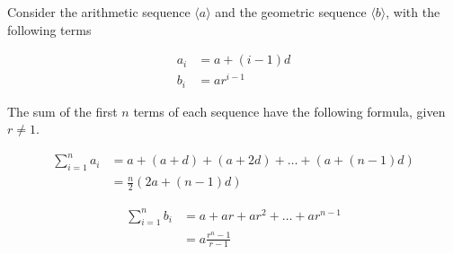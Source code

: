 \documentclass[twoside]{report}
\begin{document}
\vspace{\baselineskip}
\begin{theorem}
	Consider the arithmetic sequence $\langle a \rangle$ and the geometric sequence $\langle b \rangle$, with the following terms
	
	\begin{align*}
		a_i &= a + (i - 1)d \\
		b_i &= a r^{i - 1}
	\end{align*}
	
	The sum of the first $n$ terms of each sequence have the following formula, given $r \neq 1$.
	
	\begin{align}
		\sum_{i = 1}^n a_i &=  a + (a + d) + (a + 2d) + \dots + (a + (n - 1)d) \\
		&= \frac{n}{2} \left( 2a + (n - 1)d \right)
	\end{align}
	
	\begin{align}
		\sum_{i = 1}^n b_i &=  a + ar + ar^2 + \dots + ar^{n - 1} \\
		&= a \frac{r^n - 1}{r - 1}
	\end{align}
\end{theorem}
\end{document}
